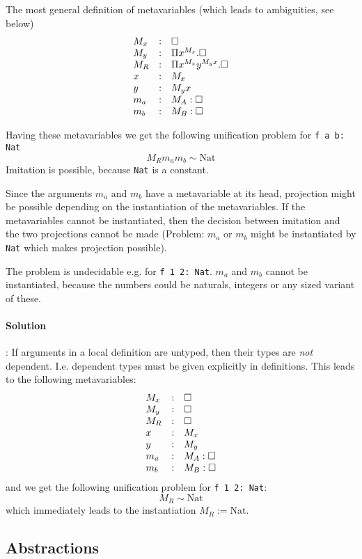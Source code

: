 The most general definition of metavariables (which leads to ambiguities, see
below)
$$
\begin{array}{lllll} 
    M_x &:& {\Box}
    \\
    M_y &:& \Pi x^{M_x}. {\Box}
    \\
    M_R &:& \Pi x^{M_x} y^{M_y x}. {\Box}
    \\
    x &:& M_x
    \\
    y &:& M_y x
    \\
    m_a &:& M_A: {\Box}
    \\
    m_b &:& M_B: {\Box}
 \end{array}
$$

Having these metavariables we get the following unification problem for
{\tt f a b: Nat}
$$
    M_R m_a m_b \sim \text{Nat}
$$
Imitation is possible, because {\tt Nat} is a constant.

Since the arguments $m_a$ and $m_b$ have a metavariable at its head, projection
might be possible depending on the instantiation of the metavariables. If the
metavariables cannot be instantiated, then the decision between imitation and
the two projections cannot be made (Problem: $m_a$ or $m_b$ might be
instantiated by {\tt Nat} which makes projection possible).

The problem is undecidable e.g. for {\tt f 1 2: Nat}. $m_a$ and $m_b$ cannot be
instantiated, because the numbers could be naturals, integers or any sized
variant of these.

\paragraph{Solution}: If arguments in a local definition are untyped, then their
types are \emph{not} dependent. I.e. dependent types must be given explicitly
in definitions. This leads to the following metavariables:
$$
\begin{array}{lllll} 
    M_x &:& {\Box}
    \\
    M_y &:& {\Box}
    \\
    M_R &:& {\Box}
    \\
    x &:& M_x
    \\
    y &:& M_y
    \\
    m_a &:& M_A: {\Box}
    \\
    m_b &:& M_B: {\Box}
 \end{array}
$$
and we get the following unification problem for {\tt f 1 2: Nat}:
$$
    M_R \sim \text{Nat}
$$
which immediately leads to the instantiation $M_R := \text{Nat}$.







\subsection{Abstractions}

